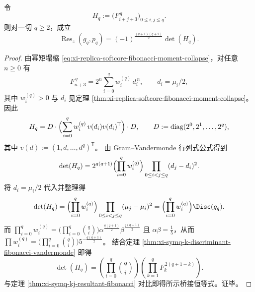 \begin{proposition}\label{prop:xi-symq-hankel-sylvester-bridge}
令
\[
H_q:=\bigl(F_{i+j+3}^{\,q}\bigr)_{0\le i,j\le q}.
\]
则对一切 \(q\ge 2\)，成立
\[
\operatorname{Res}_z(g_q,p_q)
=(-1)^{\frac{(q+1)(q+2)}2}\det(H_q).
\]
\end{proposition}
\begin{proof}
由幂矩塌缩 \eqref{eq:xi-replica-softcore-fibonacci-moment-collapse}，对任意 \(n\ge 0\) 有
\[
F_{n+3}^{\,q}=2^{n}\sum_{i=0}^{q}w_i^{(q)}\,d_i^{\,n},
\qquad
d_i=\mu_i/2,
\]
其中 \(w_i^{(q)}>0\) 与 \(d_i\) 见定理 \ref{thm:xi-replica-softcore-fibonacci-moment-collapse}。
因此
\[
H_q
=D\cdot \Bigl(\sum_{i=0}^{q}w_i^{(q)}\,v(d_i)v(d_i)^{\mathsf T}\Bigr)\cdot D,
\qquad
D:=\mathrm{diag}(2^0,2^1,\dots,2^{q}),
\]
其中 \(v(d):=(1,d,\dots,d^{q})^{\mathsf T}\)。
由 Gram--Vandermonde 行列式公式得到
\[
\det(H_q)
=2^{q(q+1)}\Bigl(\prod_{i=0}^{q}w_i^{(q)}\Bigr)\prod_{0\le i<j\le q}(d_j-d_i)^2.
\]
将 \(d_i=\mu_i/2\) 代入并整理得
\[
\det(H_q)
=\Bigl(\prod_{i=0}^{q}w_i^{(q)}\Bigr)\prod_{0\le i<j\le q}(\mu_j-\mu_i)^2
=\Bigl(\prod_{i=0}^{q}w_i^{(q)}\Bigr)\Disc(g_q).
\]
而 \(\prod_{i=0}^{q}w_i^{(q)}=\bigl(\prod_{i=0}^{q}\binom{q}{i}\bigr)\alpha^{\frac{q(q+1)}2}\beta^{\frac{q(q+1)}2}\)
且 \(\alpha\beta=\frac15\)，从而
\(\prod w_i^{(q)}=\bigl(\prod_{i=0}^{q}\binom{q}{i}\bigr)5^{-\frac{q(q+1)}2}\)。
结合定理 \ref{thm:xi-symq-k-discriminant-fibonacci-vandermonde} 即得
\[
\det(H_q)
=\left(\prod_{i=0}^{q}\binom{q}{i}\right)\left(\prod_{k=1}^{q}F_k^{\,2(q+1-k)}\right).
\]
与定理 \ref{thm:xi-symq-kj-resultant-fibonacci} 对比即得所示桥接恒等式。证毕。
\end{proof}

